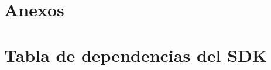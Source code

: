 \documentclass[12pt, twoside]{article}
\begin{document}




\cleardoublepage \section{Anexos} \label{anx:dependences}
    \appendix
    \section{Tabla de dependencias del SDK}
\end{document}
